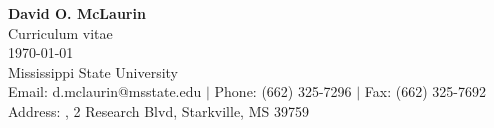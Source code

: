 {\Large {\bf David O. McLaurin}} \\
Curriculum vitae \\
\today \\
{\large Mississippi State University} \\
Email: d.mclaurin@msstate.edu $|$ Phone: (662) 325-7296 $|$ Fax: (662) 325-7692 \\
Address: \HPC, 2 Research Blvd, Starkville, MS 39759 \\
